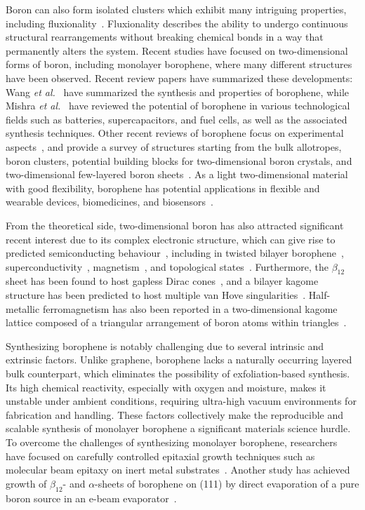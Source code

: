 Boron can also form isolated clusters which exhibit many intriguing properties,
including fluxionality~\cite{pan2019fluxional}.
Fluxionality describes the ability to undergo continuous structural rearrangements without breaking chemical bonds in a way that permanently alters the system.
Recent studies have focused on two-dimensional forms of boron,
including monolayer borophene, where many different structures have been observed.
Recent review papers have summarized these developments:
Wang \textit{et al.}~\cite{wang2024borophene} have summarized the synthesis and properties of borophene,
while Mishra \textit{et al.}~\cite{mishra2024borophene} have reviewed the potential of borophene in various technological fields such as batteries, supercapacitors, and fuel cells, as well as the associated synthesis techniques.
Other recent reviews of borophene focus on experimental aspects~\cite{mohanty2023review,yang2023borophenes,kumar2024,xie2020two},
and provide a survey of structures starting from the bulk allotropes, boron clusters,
potential building blocks for two-dimensional boron crystals, and two-dimensional few-layered boron sheets~\cite{sun2017two}.
As a light two-dimensional material with good flexibility,
borophene has potential applications in flexible and wearable devices, biomedicines,
and biosensors~\cite{mozvashi2021mechanical,zhang2017elasticity}.

From the theoretical side,
two-dimensional boron has also attracted significant recent interest due to its complex electronic structure,
which can give rise to predicted semiconducting behaviour~\cite{qureshi2024bilayer},
including in twisted bilayer borophene~\cite{jin2022tuning},
superconductivity~\cite{gao2017prediction,han2023superconducting},
magnetism~\cite{zhu2019magnetic}, and topological states~\cite{wang2025second,rakshit2025exploring,wang2019serendipity}.
Furthermore, the $\beta_{12}$ sheet has been found to host gapless Dirac cones~\cite{feng2017dirac},
and a bilayer kagome structure has been predicted to host multiple van Hove singularities~\cite{gao2024bilayer}.
Half-metallic ferromagnetism has also been reported in a two-dimensional kagome lattice composed of a triangular arrangement of boron atoms within triangles~\cite{kim2017boron}.

Synthesizing borophene is notably challenging due to several intrinsic and extrinsic factors.
Unlike graphene, borophene lacks a naturally occurring layered bulk counterpart,
which eliminates the possibility of exfoliation-based synthesis.
Its high chemical reactivity,
especially with oxygen and moisture, makes it unstable under ambient conditions,
requiring ultra-high vacuum environments for fabrication and handling.
These factors collectively make the reproducible and scalable synthesis of monolayer borophene a significant materials science hurdle.
To overcome the challenges of synthesizing monolayer borophene,
researchers have focused on carefully controlled epitaxial growth techniques such as molecular beam epitaxy on inert metal substrates~\cite{chen2022synthesis}.
Another study has achieved growth of $\beta_{12}$- and $\alpha$-sheets of borophene on (111) by direct evaporation of a pure boron source in an e-beam evaporator~\cite{zhong2017metastable}.

